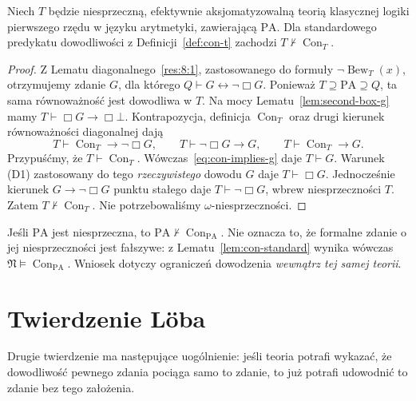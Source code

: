 \begin{twierdzenie}
\label{thm:godel-second}
Niech $T$ będzie niesprzeczną, efektywnie
aksjomatyzowalną teorią klasycznej logiki pierwszego
rzędu w języku arytmetyki, zawierającą $\mathrm{PA}$.
Dla standardowego predykatu dowodliwości
z Definicji~\ref{def:con-t} zachodzi
$T\nvdash\operatorname{Con}_T$.
\end{twierdzenie}
\begin{proof}
Z Lematu diagonalnego~\ref{res:8:1}, zastosowanego
do formuły $\neg\operatorname{Bew}_T(x)$,
otrzymujemy zdanie $G$, dla którego
$Q\vdash G\leftrightarrow\neg\Box G$.
Ponieważ $T\supseteq\mathrm{PA}\supseteq Q$,
ta sama równoważność jest dowodliwa w $T$.
Na mocy Lematu~\ref{lem:second-box-g} mamy
$T\vdash\Box G\to\Box\bot$.
Kontrapozycja, definicja $\operatorname{Con}_T$
oraz drugi kierunek równoważności diagonalnej dają
\begin{equation}\label{eq:con-implies-g}
T\vdash\operatorname{Con}_T\to\neg\Box G,
\qquad T\vdash\neg\Box G\to G,
\qquad T\vdash\operatorname{Con}_T\to G.
\end{equation}
Przypuśćmy, że $T\vdash\operatorname{Con}_T$.
Wówczas~\eqref{eq:con-implies-g} daje $T\vdash G$.
Warunek (D1) zastosowany do tego \emph{rzeczywistego}
dowodu $G$ daje $T\vdash\Box G$.
Jednocześnie kierunek $G\to\neg\Box G$ punktu
stałego daje $T\vdash\neg\Box G$, wbrew
niesprzeczności $T$. Zatem
$T\nvdash\operatorname{Con}_T$.
Nie potrzebowaliśmy $\omega$-niesprzeczności.
\end{proof}

\begin{przyklad}
Jeśli $\mathrm{PA}$ jest niesprzeczna, to
$\mathrm{PA}\nvdash\operatorname{Con}_{\mathrm{PA}}$.
Nie oznacza to, że formalne zdanie o jej
niesprzeczności jest fałszywe: z
Lematu~\ref{lem:con-standard} wynika wówczas
$\mathfrak N\models\operatorname{Con}_{\mathrm{PA}}$.
Wniosek dotyczy ograniczeń dowodzenia
\emph{wewnątrz tej samej teorii}.
\end{przyklad}

\section{Twierdzenie Löba}
Drugie twierdzenie ma następujące uogólnienie:
jeśli teoria potrafi wykazać, że dowodliwość
pewnego zdania pociąga samo to zdanie, to już
potrafi udowodnić to zdanie bez tego założenia.

